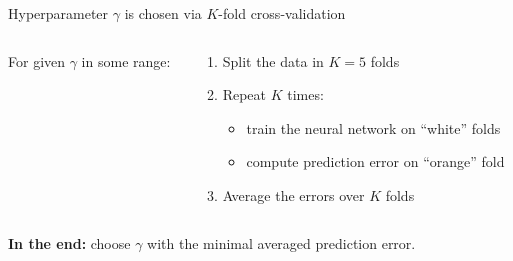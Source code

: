 \documentclass{beamer}
\def\\{}%
\begin{document}
\begin{frame}{Hyperparameter $\gamma$ is chosen via $K$-fold cross-validation}
\vspace{0.5cm}
\begin{columns}
    \begin{column}{0.3\textwidth}
        For given $\gamma$ in some range:
    \end{column}
    \begin{column}{0.7\textwidth}
        \begin{enumerate}
        \item Split the data in $K = 5$ folds
        \item Repeat $K$ times:\
            \begin{itemize}
            \item train the neural network on ``white'' folds
            \item compute prediction error on ``orange'' fold
            \end{itemize}
        \item Average the errors over $K$ folds
        \end{enumerate}
    \end{column}
\end{columns}

\vspace{0.7cm}
\textbf{In the end:} choose $\gamma$ with the minimal averaged prediction error.
\end{frame}
\end{document}
